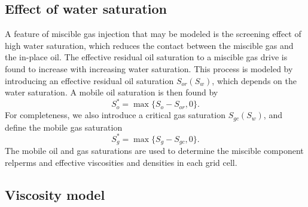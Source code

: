 \documentclass[11pt, a4paper]{article}
\begin{document}
\subsection*{Effect of water saturation}

A feature of miscible gas injection that may be modeled is the screening effect
of high water saturation, which reduces the contact between the miscible gas and
the in-place oil. The effective residual oil saturation to a miscible gas drive
is found to increase with increasing water saturation. This process is modeled
by introducing an effective residual oil saturation $S_{or}(S_w)$, which depends
on the water saturation. A mobile oil saturation is then found by
\begin{equation*}
  S_o^* = \max\{S_o - S_{or}, 0\}.
\end{equation*}
For completeness, we also introduce a critical gas saturation $S_{gc}(S_w)$, and define the mobile
gas saturation
\begin{equation*}
  S_g^* = \max\{S_g - S_{gc}, 0\}.
\end{equation*}
The mobile oil and gas saturations are used to determine the miscible component relperms and
effective viscosities and densities in each grid cell.

\subsection*{Viscosity model}
\end{document}
